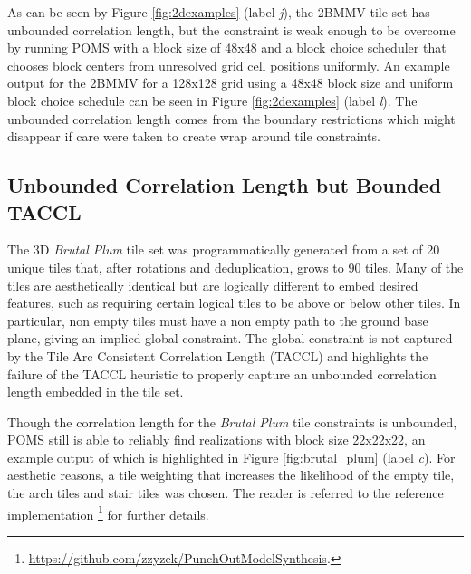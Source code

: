 As can be seen by Figure \ref{fig:2dexamples} (label \textit{j}), the 2BMMV tile set has unbounded correlation length, but the constraint is weak
enough to be overcome by running POMS with a block size of 48x48 and a block choice scheduler that chooses block centers from
unresolved grid cell positions uniformly.
An example output for the 2BMMV for a 128x128 grid using a 48x48 block size and uniform block choice schedule can be seen in Figure \ref{fig:2dexamples} (label \textit{l}).
The unbounded correlation length comes from the boundary restrictions which might disappear if care were taken
to create wrap around tile constraints.

\subsection{Unbounded Correlation Length but Bounded TACCL}

The 3D \textit{Brutal Plum} tile set was programmatically generated from a set of 20 unique tiles that, after rotations and deduplication,
grows to 90 tiles.
Many of the tiles are aesthetically identical but are logically different to embed desired features, such as requiring certain
logical tiles to be above or below other tiles.
In particular, non empty tiles must have a non empty path to the ground base plane, giving an implied global constraint.
The global constraint is not captured by the Tile Arc Consistent Correlation Length (TACCL) and highlights
the failure of the TACCL heuristic to properly capture an unbounded correlation length embedded in the tile set.

Though the correlation length for the \textit{Brutal Plum} tile constraints is unbounded, POMS still is able to reliably find realizations with
block size 22x22x22, an example output of which is highlighted in Figure \ref{fig:brutal_plum} (label \textit{c}).
For aesthetic reasons, a tile weighting that increases the likelihood of the empty tile, the arch tiles and
stair tiles was chosen.
The reader is referred to the reference implementation \footnote{ \label{poms-url} \url{https://github.com/zzyzek/PunchOutModelSynthesis}. }
for further details.


